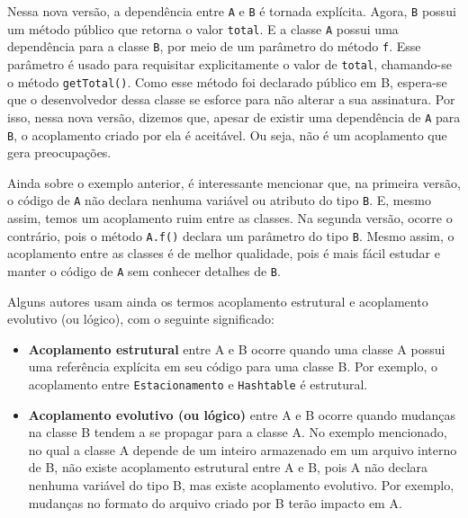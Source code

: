 \documentclass[
  11pt,
  twoside]{book}
\newcommand{\passthrough}[1]{#1}
\begin{document}
Nessa nova versão, a dependência entre \passthrough{\lstinline!A!} e
\passthrough{\lstinline!B!} é tornada explícita. Agora,
\passthrough{\lstinline!B!} possui um método público que retorna o valor
\passthrough{\lstinline!total!}. E a classe \passthrough{\lstinline!A!}
possui uma dependência para a classe \passthrough{\lstinline!B!}, por
meio de um parâmetro do método \passthrough{\lstinline!f!}. Esse
parâmetro é usado para requisitar explicitamente o valor de
\passthrough{\lstinline!total!}, chamando-se o método
\passthrough{\lstinline!getTotal()!}. Como esse método foi declarado
público em B, espera-se que o desenvolvedor dessa classe se esforce para
não alterar a sua assinatura. Por isso, nessa nova versão, dizemos que,
apesar de existir uma dependência de \passthrough{\lstinline!A!} para
\passthrough{\lstinline!B!}, o acoplamento criado por ela é aceitável.
Ou seja, não é um acoplamento que gera preocupações.

Ainda sobre o exemplo anterior, é interessante mencionar que, na
primeira versão, o código de \passthrough{\lstinline!A!} não declara
nenhuma variável ou atributo do tipo \passthrough{\lstinline!B!}. E,
mesmo assim, temos um acoplamento ruim entre as classes. Na segunda
versão, ocorre o contrário, pois o método
\passthrough{\lstinline!A.f()!} declara um parâmetro do tipo
\passthrough{\lstinline!B!}. Mesmo assim, o acoplamento entre as classes
é de melhor qualidade, pois é mais fácil estudar e manter o código de
\passthrough{\lstinline!A!} sem conhecer detalhes de
\passthrough{\lstinline!B!}.

 
 Alguns autores usam ainda os termos
acoplamento estrutural e acoplamento evolutivo (ou lógico), com o
seguinte significado:

\begin{itemize}
\item
  \textbf{Acoplamento estrutural} entre A e B ocorre quando uma classe A
  possui uma referência explícita em seu código para uma classe B. Por
  exemplo, o acoplamento entre \passthrough{\lstinline!Estacionamento!}
  e \passthrough{\lstinline!Hashtable!} é estrutural.
\item
  \textbf{Acoplamento evolutivo (ou lógico)} entre A e B ocorre quando
  mudanças na classe B tendem a se propagar para a classe A. No exemplo
  mencionado, no qual a classe A depende de um inteiro armazenado em um
  arquivo interno de B, não existe acoplamento estrutural entre A e B,
  pois A não declara nenhuma variável do tipo B, mas existe acoplamento
  evolutivo. Por exemplo, mudanças no formato do arquivo criado por B
  terão impacto em A.
\end{itemize}
\end{document}
